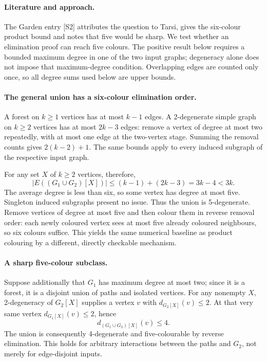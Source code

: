 \documentclass[11pt,a4paper]{article}
\begin{document}
\paragraph{Literature and approach.}
The Garden entry [S2] attributes the question to Tarsi, gives the six-colour product bound and notes that five would be sharp. We test whether an elimination proof can reach five colours. The positive result below requires a bounded maximum degree in one of the two input graphs; degeneracy alone does not impose that maximum-degree condition. Overlapping edges are counted only once, so all degree sums used below are upper bounds.

\paragraph{The general union has a six-colour elimination order.}
A forest on $k\ge1$ vertices has at most $k-1$ edges. A 2-degenerate simple graph on $k\ge2$ vertices has at most $2k-3$ edges: remove a vertex of degree at most two repeatedly, with at most one edge at the two-vertex stage. Summing the removal counts gives $2(k-2)+1$. The same bounds apply to every induced subgraph of the respective input graph.

For any set $X$ of $k\ge2$ vertices, therefore,
\[
 |E((G_1\cup G_2)[X])|\le(k-1)+(2k-3)=3k-4<3k.
\]
The average degree is less than six, so some vertex has degree at most five. Singleton induced subgraphs present no issue. Thus the union is 5-degenerate. Remove vertices of degree at most five and then colour them in reverse removal order: each newly coloured vertex sees at most five already coloured neighbours, so six colours suffice. This yields the same numerical baseline as product colouring by a different, directly checkable mechanism.

\paragraph{A sharp five-colour subclass.}
Suppose additionally that $G_1$ has maximum degree at most two; since it is a forest, it is a disjoint union of paths and isolated vertices. For any nonempty $X$, 2-degeneracy of $G_2[X]$ supplies a vertex $v$ with $d_{G_2[X]}(v)\le2$. At that very same vertex $d_{G_1[X]}(v)\le2$, hence
\[
 d_{(G_1\cup G_2)[X]}(v)\le4.
\]
The union is consequently 4-degenerate and five-colourable by reverse elimination. This holds for arbitrary interactions between the paths and $G_2$, not merely for edge-disjoint inputs.
\end{document}
